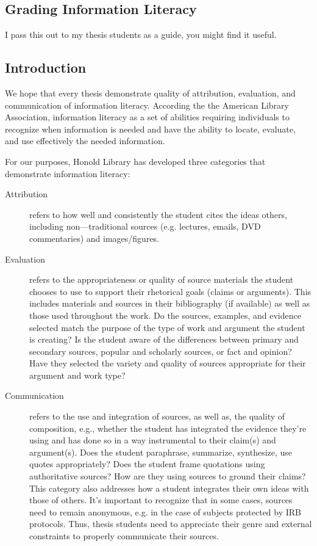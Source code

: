 \documentclass{article}\usepackage[]{graphicx}\usepackage[]{color}
\begin{document}
\subsection{Grading Information Literacy}

I pass this out to my thesis students as a guide, you might find it useful.

\subsection{Introduction}

We hope that every thesis demonstrate quality of attribution, evaluation, and communication of information literacy. According the the American Library Association, information literacy as a set of abilities requiring individuals to recognize when information is needed and have the ability to locate, evaluate, and use effectively the needed information.

For our purposes, Honold Library has developed three categories that demonstrate information literacy:

\begin{description}
	\item[Attribution] refers to how well and consistently the student cites the ideas others,
including non---traditional sources (e.g. lectures, emails, DVD commentaries) and images/figures.

	\item[Evaluation] refers to the appropriateness or quality of source materials the student chooses to use
to support their rhetorical goals (claims or arguments). This includes materials and sources in their bibliography (if available) as well as those used throughout the work. Do the sources, examples, and evidence selected match the purpose of the type of work and argument the student is creating? Is the student aware of the differences between primary and secondary sources, popular and scholarly sources, or fact and opinion? Have they selected the variety and quality of sources appropriate for their argument and work type?

	\item[Communication] refers to the use and integration of sources, as well as, the quality of composition, e.g., whether the student has integrated the evidence they're using and has done so in a way instrumental to their claim(s) and argument(s). Does the student paraphrase, summarize, synthesize, use quotes appropriately? Does the student frame quotations using authoritative sources? How are they using sources to ground their claims? This category also addresses how a student integrates their own ideas with those of others. It's important to recognize that in some cases, sources need to remain anonymous, e.g. in the case of subjects protected by IRB protocols. Thus, thesis students need to appreciate their genre and external constraints to properly communicate their sources. 
\end{description}
\end{document}
